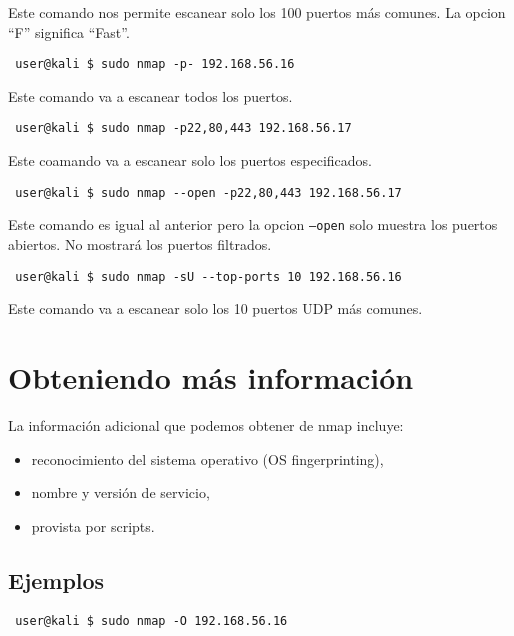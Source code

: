 \documentclass{article}
\begin{document}
Este comando nos permite escanear solo los 100 puertos m\'as comunes. La opcion ``F'' significa ``Fast''.

\begin{lstlisting}
 user@kali $ sudo nmap -p- 192.168.56.16
\end{lstlisting}

Este comando va a escanear todos los puertos.

\begin{lstlisting}
 user@kali $ sudo nmap -p22,80,443 192.168.56.17
\end{lstlisting}

Este coamando va a escanear solo los puertos especificados.

\begin{lstlisting}
 user@kali $ sudo nmap --open -p22,80,443 192.168.56.17
\end{lstlisting}

Este comando es igual al anterior pero la opcion \texttt{--open} solo muestra los puertos abiertos. No mostrar\'a los puertos filtrados.

\begin{lstlisting}
 user@kali $ sudo nmap -sU --top-ports 10 192.168.56.16
\end{lstlisting}

Este comando va a escanear solo los 10 puertos UDP m\'as comunes.

\section{Obteniendo m\'as informaci\'on}

La informaci\'on adicional que podemos obtener de nmap incluye:

\begin{itemize}
    \item reconocimiento del sistema operativo (OS fingerprinting),
    \item nombre y versi\'on de servicio,
    \item provista por scripts.
\end{itemize}

\subsection{Ejemplos}

\begin{lstlisting}
 user@kali $ sudo nmap -O 192.168.56.16
\end{lstlisting}
\end{document}
